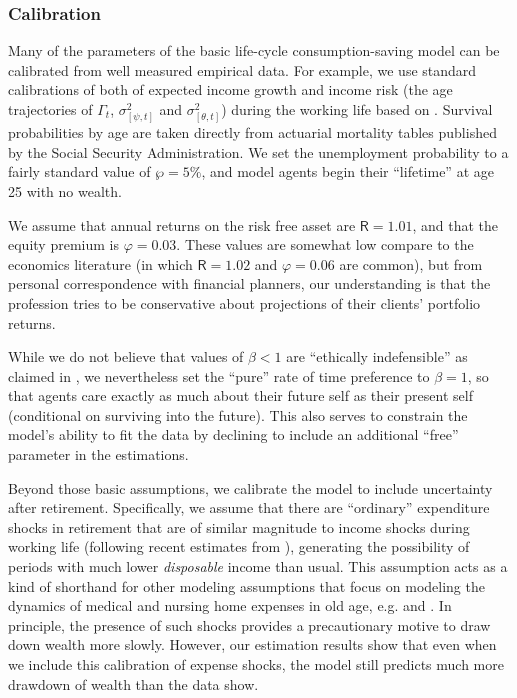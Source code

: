 \documentclass{article}
\newcommand{\DiscFac}{\beta}
\newcommand{\permGroFac}{\Gamma}
\newcommand{\permShk}{\psi}
\newcommand{\tranShk}{\theta}
\newcommand{\pZero}{\wp}
\newcommand{\Rfree}{\mathsf{R}}
\newcommand{\eprem}{\varphi}
\begin{document}
\bigskip\subsubsection{Calibration}

Many of the parameters of the basic life-cycle consumption-saving model can be calibrated from well measured empirical data.
For example, we use standard calibrations of both of expected income growth and income risk (the age trajectories of $\permGroFac_t$, $\sigma_{[\permShk, t]}^2$ and $\sigma_{[\tranShk, t]}^2$) during the working life based on \cite{Cagetti2003}.
Survival probabilities by age are taken directly from actuarial mortality tables published by the Social Security Administration.
We set the unemployment probability to a fairly standard value of $\pZero = 5\%$, and
model agents begin their ``lifetime'' at age 25 with no wealth.

We assume that annual returns on the risk free asset are $\Rfree = 1.01$, and that the equity premium is $\eprem = 0.03$.
These values are somewhat low compare to the economics literature (in which $\Rfree = 1.02$ and $\eprem = 0.06$ are common), but from personal correspondence with financial planners, our understanding is that the profession tries to be conservative about projections of their clients' portfolio returns.

While we do not believe that values of $\DiscFac < 1$ are ``ethically indefensible'' as claimed in \cite{Ramsey1928}, we nevertheless set the ``pure'' rate of time preference to $\DiscFac=1$, so that agents care exactly as much about their future self as their present self (conditional on surviving into the future).
This also serves to constrain the model's ability to fit the data by declining to include an additional ``free'' parameter in the estimations.

Beyond those basic assumptions, we calibrate the model to include uncertainty after retirement.
Specifically, we assume that there are ``ordinary'' expenditure shocks in retirement that are of similar magnitude to income shocks during working life (following recent estimates from \cite{flExpShocks}), generating the possibility of periods with much lower \textit{disposable} income than usual.
This assumption acts as a kind of shorthand for other modeling assumptions that focus on modeling the dynamics of medical and nursing home expenses in old age, e.g. \cite{ameriks2011joy} and \cite{DeNardi2010}.
In principle, the presence of such shocks provides a precautionary motive to draw down wealth more slowly.
However, our estimation results show that even when we include this calibration of expense shocks, the model still predicts much more drawdown of wealth than the data show.
\end{document}
